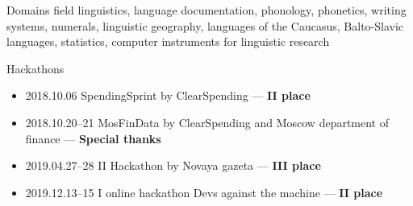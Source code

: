 \documentclass{resume} %
\begin{document}
\begin{rSection}{Domains}
field linguistics, language documentation, phonology, phonetics, writing systems, numerals, linguistic geography, languages of the Caucasus, Balto-Slavic languages, statistics, computer instruments for linguistic research
\end{rSection}

\begin{rSection}{Hackathons}
\begin{itemize}
\item 2018.10.06  SpendingSprint by ClearSpending  --- \textbf{II place}
\item 2018.10.20--21  MosFinData by ClearSpending and Moscow department of finance
 --- \textbf{Special thanks} 
\item  2019.04.27--28 II Hackathon by Novaya gazeta --- \textbf{III place} 
\item 2019.12.13--15 I online hackathon Devs against the machine --- \textbf{II place} 
\end{itemize}

\end{rSection}
\end{document}
